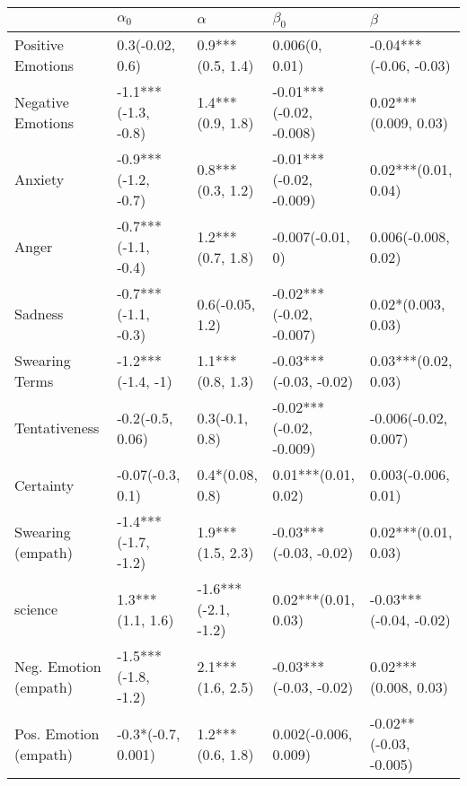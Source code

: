 \begin{tabular}{lllll}
\toprule
{} &           $\alpha_0$ &             $\alpha$ &                $\beta_0$ &                 $\beta$ \\
\midrule
Positive Emotions     &      0.3(-0.02, 0.6) &     0.9***(0.5, 1.4) &           0.006(0, 0.01) &  -0.04***(-0.06, -0.03) \\
Negative Emotions     &  -1.1***(-1.3, -0.8) &     1.4***(0.9, 1.8) &  -0.01***(-0.02, -0.008) &    0.02***(0.009, 0.03) \\
Anxiety               &  -0.9***(-1.2, -0.7) &     0.8***(0.3, 1.2) &  -0.01***(-0.02, -0.009) &     0.02***(0.01, 0.04) \\
Anger                 &  -0.7***(-1.1, -0.4) &     1.2***(0.7, 1.8) &         -0.007(-0.01, 0) &     0.006(-0.008, 0.02) \\
Sadness               &  -0.7***(-1.1, -0.3) &      0.6(-0.05, 1.2) &  -0.02***(-0.02, -0.007) &      0.02*(0.003, 0.03) \\
Swearing Terms        &    -1.2***(-1.4, -1) &     1.1***(0.8, 1.3) &   -0.03***(-0.03, -0.02) &     0.03***(0.02, 0.03) \\
Tentativeness         &     -0.2(-0.5, 0.06) &       0.3(-0.1, 0.8) &  -0.02***(-0.02, -0.009) &    -0.006(-0.02, 0.007) \\
Certainty             &     -0.07(-0.3, 0.1) &      0.4*(0.08, 0.8) &      0.01***(0.01, 0.02) &     0.003(-0.006, 0.01) \\
Swearing (empath)     &  -1.4***(-1.7, -1.2) &     1.9***(1.5, 2.3) &   -0.03***(-0.03, -0.02) &     0.02***(0.01, 0.03) \\
science               &     1.3***(1.1, 1.6) &  -1.6***(-2.1, -1.2) &      0.02***(0.01, 0.03) &  -0.03***(-0.04, -0.02) \\
Neg. Emotion (empath) &  -1.5***(-1.8, -1.2) &     2.1***(1.6, 2.5) &   -0.03***(-0.03, -0.02) &    0.02***(0.008, 0.03) \\
Pos. Emotion (empath) &   -0.3*(-0.7, 0.001) &     1.2***(0.6, 1.8) &     0.002(-0.006, 0.009) &  -0.02**(-0.03, -0.005) \\
\bottomrule
\end{tabular}
